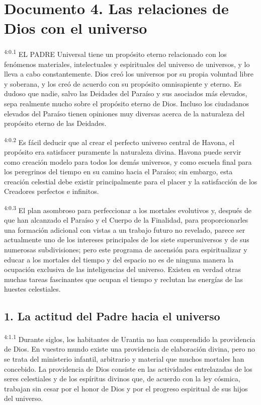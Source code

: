 \chapter{Documento 4. Las relaciones de Dios con el universo}
\par
\textsuperscript{4:0.1} EL PADRE Universal tiene un propósito eterno relacionado con los fenómenos materiales, intelectuales y espirituales del universo de universos, y lo lleva a cabo constantemente. Dios creó los universos por su propia voluntad libre y soberana, y los creó de acuerdo con su propósito omnisapiente y eterno. Es dudoso que nadie, salvo las Deidades del Paraíso y sus asociados más elevados, sepa realmente mucho sobre el propósito eterno de Dios. Incluso los ciudadanos elevados del Paraíso tienen opiniones muy diversas acerca de la naturaleza del propósito eterno de las Deidades.

\par
\textsuperscript{4:0.2} Es fácil deducir que al crear el perfecto universo central de Havona, el propósito era satisfacer puramente la naturaleza divina. Havona puede servir como creación modelo para todos los demás universos, y como escuela final para los peregrinos del tiempo en su camino hacia el Paraíso; sin embargo, esta creación celestial debe existir principalmente para el placer y la satisfacción de los Creadores perfectos e infinitos.

\par
\textsuperscript{4:0.3} El plan asombroso para perfeccionar a los mortales evolutivos y, después de que han alcanzado el Paraíso y el Cuerpo de la Finalidad, para proporcionarles una formación adicional con vistas a un trabajo futuro no revelado, parece ser actualmente uno de los intereses principales de los siete superuniversos y de sus numerosas subdivisiones; pero este programa de ascensión para espiritualizar y educar a los mortales del tiempo y del espacio no es de ninguna manera la ocupación exclusiva de las inteligencias del universo. Existen en verdad otras muchas tareas fascinantes que ocupan el tiempo y reclutan las energías de las huestes celestiales.

\section*{1. La actitud del Padre hacia el universo}
\par
\textsuperscript{4:1.1} Durante siglos, los habitantes de Urantia no han comprendido la providencia de Dios. En vuestro mundo existe una providencia de elaboración divina, pero no se trata del ministerio infantil, arbitrario y material que muchos mortales han concebido. La providencia de Dios consiste en las actividades entrelazadas de los seres celestiales y de los espíritus divinos que, de acuerdo con la ley cósmica, trabajan sin cesar por el honor de Dios y por el progreso espiritual de sus hijos del universo.

